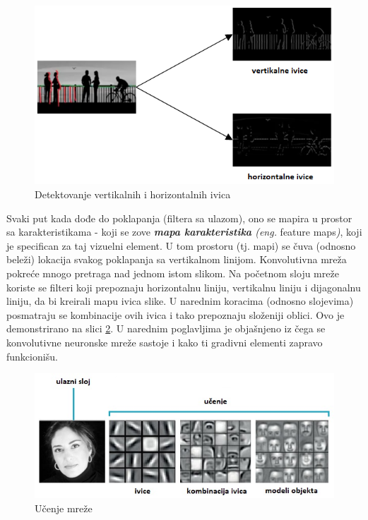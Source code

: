 \documentclass[a4paper]{article}
\begin{document}
\begin{figure}[h!]
\begin{center}
\includegraphics[scale=1]{edges.png}
\end{center}
\caption{Detektovanje vertikalnih i horizontalnih ivica}
\label{fig:edges}
\end{figure}

Svaki put kada dođe do poklapanja (filtera sa ulazom), ono se mapira u prostor sa karakteristikama - koji se zove \textit{\textbf{mapa karakteristika} (eng.} feature maps\textit{)}, koji je specifican za taj vizuelni element. U tom prostoru (tj. mapi) se čuva (odnosno beleži) lokacija svakog poklapanja sa vertikalnom linijom. Konvolutivna mreža pokreće mnogo pretraga nad jednom istom slikom. Na početnom sloju mreže koriste se filteri koji prepoznaju horizontalnu liniju, vertikalnu liniju i dijagonalnu liniju, da bi kreirali mapu ivica slike. U narednim koracima (odnosno slojevima) posmatraju se kombinacije ovih ivica i tako prepoznaju složeniji oblici. Ovo je demonstrirano na slici \ref{fig:learning}. U narednim poglavljima je objašnjeno iz čega se  konvolutivne neuronske mreže sastoje i kako ti gradivni elementi zapravo funkcionišu.

\begin{figure}[h!]
\begin{center}
\includegraphics[scale=0.9]{learning.jpg}
\end{center}
\caption{Učenje mreže}
\label{fig:learning}
\end{figure}
\end{document}
